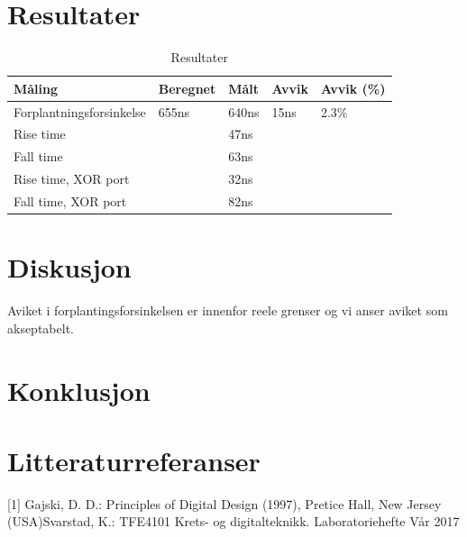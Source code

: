 \documentclass{article}
\begin{document}
\section{Resultater}
\begin{table}[h]
	\centering
	\caption{Resultater}
	\label{my-label}
	\begin{tabular}{| l | l | l | l | l |} \hline
	Måling & Beregnet & Målt & Avvik & Avvik (\%) \\ \hline
	Forplantningsforsinkelse & 655ns             & 640ns         & 15ns          & 2.3\%              \\ \hline
	Rise time                &                   & 47ns          &               &                    \\ \hline
	Fall time                &                   & 63ns          &               &                    \\ \hline
	Rise time, XOR port      &                   & 32ns          &               &                    \\ \hline
	Fall time, XOR port      &                   & 82ns          &               & 				   \\ \hline
	\end{tabular}
\end{table}

\newpage
\section{Diskusjon}
Aviket i forplantingsforsinkelsen er innenfor reele grenser og vi anser aviket som akseptabelt.
\section{Konklusjon}



\section{Litteraturreferanser}
[1] Gajski, D. D.: Principles of Digital Design (1997), Pretice Hall, New Jersey (USA)\newline
[2] Svarstad, K.: TFE4101 Krets- og digitalteknikk. Laboratoriehefte Vår 2017
\end{document}
